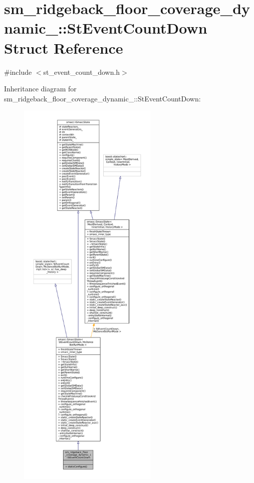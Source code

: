 \hypertarget{structsm__ridgeback__floor__coverage__dynamic__1_1_1StEventCountDown}{}\section{sm\+\_\+ridgeback\+\_\+floor\+\_\+coverage\+\_\+dynamic\+\_\+:\+:St\+Event\+Count\+Down Struct Reference}
\label{structsm__ridgeback__floor__coverage__dynamic__1_1_1StEventCountDown}


{\ttfamily \#include $<$st\+\_\+event\+\_\+count\+\_\+down.\+h$>$}



Inheritance diagram for sm\+\_\+ridgeback\+\_\+floor\+\_\+coverage\+\_\+dynamic\+\_\+:\+:St\+Event\+Count\+Down\+:
\nopagebreak
\begin{figure}[H]
\begin{center}
\leavevmode
\includegraphics[height=550pt]{structsm__ridgeback__floor__coverage__dynamic__1_1_1StEventCountDown__inherit__graph}
\end{center}
\end{figure}


